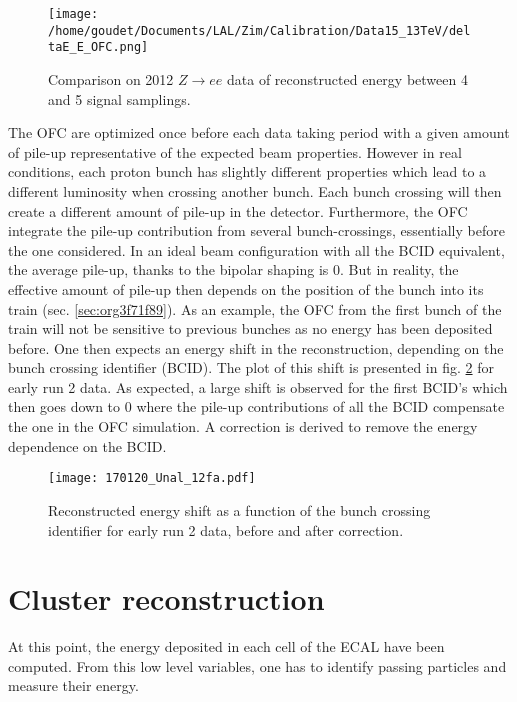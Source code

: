 \begin{figure}[htbp]
\centering
\texttt{[image: /home/goudet/Documents/LAL/Zim/Calibration/Data15\_13TeV/deltaE\_E\_OFC.png]}
\caption{\label{fig:org3364702}
Comparison on 2012 \(Z\rightarrow ee\) data of reconstructed energy between 4 and 5 signal samplings. \cite{GuillaumeUnal}}
\end{figure}


The OFC are optimized once before each data taking period with a given amount of pile-up representative of the expected beam properties.
However in real conditions, each proton bunch has slightly different properties which lead to a different luminosity when crossing another bunch.
Each bunch crossing will then create a different amount of pile-up in the detector.
Furthermore, the OFC integrate the pile-up contribution from several bunch-crossings, essentially before the one considered.
In an ideal beam configuration with all the BCID equivalent, the average pile-up, thanks to the bipolar shaping is 0.
But in reality, the effective amount of pile-up then depends on the position of the bunch into its train (sec. \ref{sec:org3f71f89}).
As an example, the OFC from the first bunch of the train will not be sensitive to previous bunches as no energy has been deposited before.
One then expects an energy shift in the reconstruction, depending on the bunch crossing identifier (BCID).
The plot of this shift is presented in fig. \ref{fig:org5f4cc56} for early run 2 data.
As expected, a large shift is observed for the first BCID's which then goes down to 0 where the pile-up contributions of all the BCID compensate the one in the OFC simulation.
A correction is derived to remove the energy dependence on the BCID.

\begin{figure}[htbp]
\centering
\texttt{[image: 170120\_Unal\_12fa.pdf]}
\caption{\label{fig:org5f4cc56}
Reconstructed energy shift as a function of the bunch crossing identifier for early run 2 data, before and after correction. \cite{GuillaumeUnal}}
\end{figure}



\section{Cluster reconstruction}
\label{sec:org78551d8}

At this point, the energy deposited in each cell of the ECAL have been computed.
From this low level variables, one has to identify passing particles and measure their energy.

